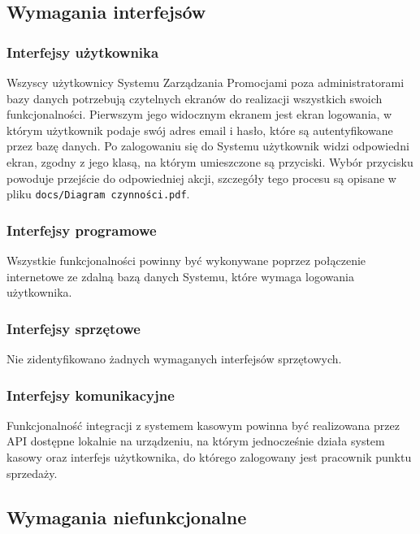 \documentclass[a4paper,12pt]{article}
\begin{document}
\subsection{Wymagania interfejsów}

\subsubsection{Interfejsy użytkownika}

Wszyscy użytkownicy Systemu Zarządzania Promocjami poza administratorami bazy danych potrzebują czytelnych ekranów do realizacji wszystkich swoich funkcjonalności.
Pierwszym jego widocznym ekranem jest ekran logowania, w którym użytkownik podaje swój adres email i hasło, które są autentyfikowane przez bazę danych.
Po zalogowaniu się do Systemu użytkownik widzi odpowiedni ekran, zgodny z jego klasą, na którym umieszczone są przyciski.
Wybór przycisku powoduje przejście do odpowiedniej akcji, szczegóły tego procesu są opisane w pliku \texttt{docs/Diagram czynności.pdf}.

\subsubsection{Interfejsy programowe}

Wszystkie funkcjonalności powinny być wykonywane poprzez połączenie internetowe ze zdalną bazą danych Systemu, które wymaga logowania użytkownika.

\subsubsection{Interfejsy sprzętowe}

Nie zidentyfikowano żadnych wymaganych interfejsów sprzętowych.

\subsubsection{Interfejsy komunikacyjne}

Funkcjonalność integracji z systemem kasowym powinna być realizowana przez API dostępne lokalnie na urządzeniu, na którym jednocześnie działa system kasowy oraz interfejs użytkownika, do którego zalogowany jest pracownik punktu sprzedaży. 

\subsection{Wymagania niefunkcjonalne}
\end{document}
